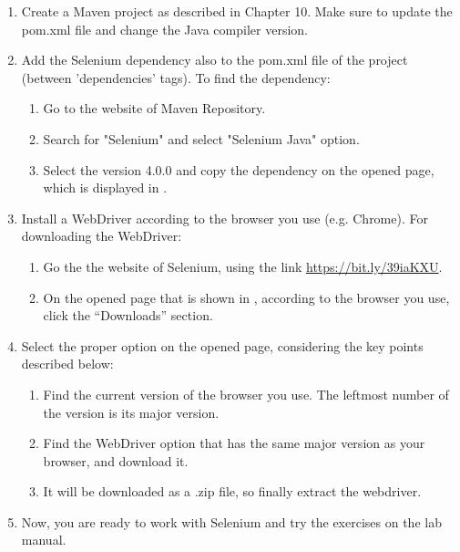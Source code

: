 \begin{enumerate}
    \item Create a Maven project as described in Chapter 10. Make sure to update the pom.xml file and change the Java compiler version.
    \item Add the Selenium dependency also to the pom.xml file of the project (between 'dependencies' tags). To find the dependency:
    \begin{enumerate}
        \item Go to the website of Maven Repository.
        \item Search for "Selenium" and select "Selenium Java" option.
        \item Select the version 4.0.0 and copy the dependency on the opened page, which is displayed in .
    \end{enumerate}
    \item Install a WebDriver according to the browser you use (e.g. Chrome). For downloading the WebDriver:
    \begin{enumerate}
        \item Go the the website of Selenium, using the link \url{https://bit.ly/39iaKXU}.
        \item On the opened page that is shown in , according to the browser you use, click the “Downloads” section.
    \end{enumerate}
    \item Select the proper option on the opened page, considering the key points described below:
    \begin{enumerate}
        \item Find the current version of the browser you use. The leftmost number of the version is its major version.
        \item Find the WebDriver option that has the same major version as your browser, and download it.
        \item It will be downloaded as a .zip file, so finally extract the webdriver.
    \end{enumerate}
    \item Now, you are ready to work with Selenium and try the exercises on the lab manual.
\end{enumerate}

